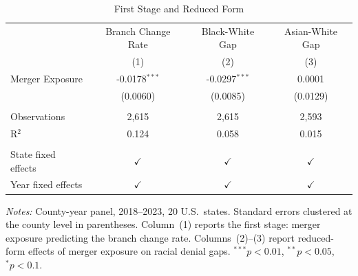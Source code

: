 
\begin{table}[htbp]
   \caption{\label{tab:first_stage} First Stage and Reduced Form}
   \bigskip
   \centering
   \begin{tabular}{lccc}
      \toprule
                                 & Branch Change Rate & Black-White Gap    & Asian-White Gap\\
                                 & (1)                & (2)                & (3)\\
      \midrule
      Merger Exposure            & -0.0178$^{***}$    & -0.0297$^{***}$    & 0.0001\\
                                 & (0.0060)           & (0.0085)           & (0.0129)\\
       \\
      Observations               & 2,615              & 2,615              & 2,593\\
      R$^2$                      & 0.124              & 0.058              & 0.015\\
       \\
      State fixed effects        & $\checkmark$       & $\checkmark$       & $\checkmark$\\
      Year fixed effects         & $\checkmark$       & $\checkmark$       & $\checkmark$\\
      \bottomrule
   \end{tabular}

   \par \raggedright \small
   \textit{Notes:} County-year panel, 2018--2023, 20 U.S.\ states. Standard errors clustered at the county level in parentheses. Column~(1) reports the first stage: merger exposure predicting the branch change rate. Columns~(2)--(3) report reduced-form effects of merger exposure on racial denial gaps. $^{***}p<0.01$, $^{**}p<0.05$, $^{*}p<0.1$.
\end{table}

